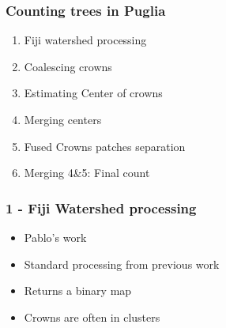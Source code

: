 \documentclass[aspectratio=169]{beamer}
\begin{document}

\begin{frame}
  \frametitle{Counting trees in Puglia}
\begin{center}
\begin{enumerate}
 \item Fiji watershed processing
 \item Coalescing crowns
 \item Estimating Center of crowns
 \item Merging centers
 \item Fused Crowns patches separation
 \item Merging 4\&5: Final count
\end{enumerate}
\end{center}
\end{frame}


{
\begin{frame}[plain]
\end{frame}}


\begin{frame}
  \frametitle{1 - Fiji Watershed processing}
\begin{center}
\begin{itemize}
 \item Pablo's work
 \item Standard processing from previous work
 \item Returns a binary map 
 \item Crowns are often in clusters
\end{itemize}
\end{center}
\end{frame}
\end{document}
